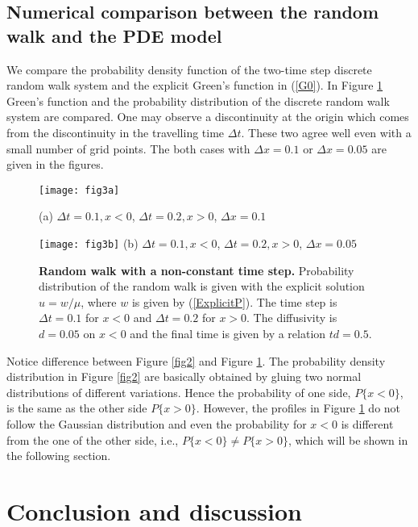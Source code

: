\documentclass[11pt]{amsart}
\def\d{d}
\begin{document}
\subsection{Numerical comparison between the random walk and the PDE model}

We compare the probability density function of the two-time step discrete random walk system and the explicit Green's function in (\ref{G0}). In Figure \ref{fig3} Green's function and the probability distribution of the discrete random walk system are compared. One may observe a discontinuity at the origin which comes from the discontinuity in the travelling time $\Delta t$. These two agree well even with a small number of grid points. The both cases with $\Delta x=0.1$ or $\Delta x=0.05$ are given in the figures.


\begin{figure}[ht]
\centering
\begin{minipage}[t]{0.49\textwidth}
 \centering
 \texttt{[image: fig3a]}

(a) $\Delta t=0.1, x<0$, $\Delta t=0.2, x>0$, $\Delta x=0.1$
\end{minipage}
\begin{minipage}[t]{0.49\textwidth}
\centering
 \texttt{[image: fig3b]}
(b) $\Delta t=0.1, x<0$, $\Delta t=0.2, x>0$, $\Delta x=0.05$
\end{minipage}
\caption{{\bf Random walk with a non-constant time step.} Probability distribution of the random walk is given with the explicit solution $u=w/\mu$, where $w$ is given by (\ref{ExplicitP}). The time step is $\Delta t=0.1$ for $x<0$ and  $\Delta t=0.2$ for $x>0$. The diffusivity is $\d=0.05$ on $x<0$ and the final time is given by a relation $t\d=0.5$.} \label{fig3}
\end{figure}
Notice difference between Figure \ref{fig2} and Figure \ref{fig3}. The probability density distribution in Figure \ref{fig2} are basically obtained by gluing two normal distributions of different variations. Hence the probability of one side, $P\{x<0\}$, is the same as the other side $P\{x>0\}$. However, the profiles in Figure \ref{fig3} do not follow the Gaussian distribution and even the probability for $x<0$ is different from the one of the other side, i.e., $P\{x<0\}\ne P\{x>0\}$, which will be shown in the following section.


\section{Conclusion and discussion}
\end{document}
